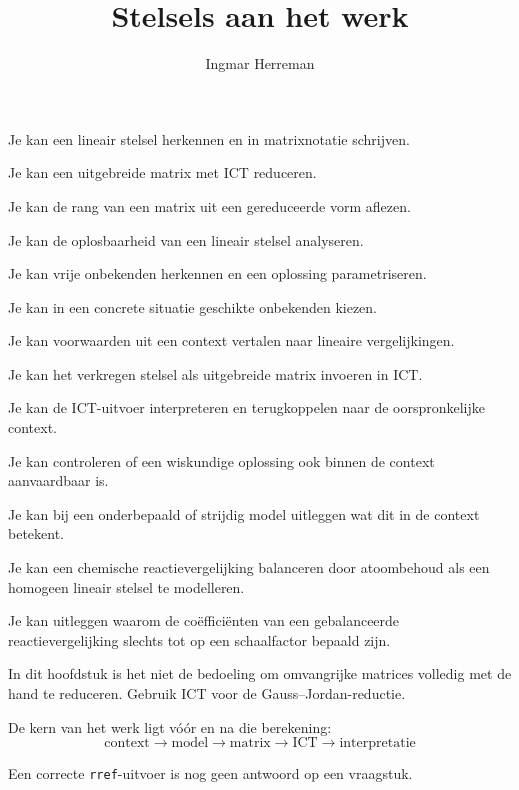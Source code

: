 \documentclass{ximera}
\title{Stelsels aan het werk}
\author{Ingmar Herreman}
\begin{document}





\maketitle

\begin{voorkennis}
  \item Je kan een lineair stelsel herkennen en in matrixnotatie schrijven.
  \item Je kan een uitgebreide matrix met ICT reduceren.
  \item Je kan de rang van een matrix uit een gereduceerde vorm aflezen.
  \item Je kan de oplosbaarheid van een lineair stelsel analyseren.
  \item Je kan vrije onbekenden herkennen en een oplossing parametriseren.
\end{voorkennis}

\begin{leerdoelen}
  \item Je kan in een concrete situatie geschikte onbekenden kiezen.
  \item Je kan voorwaarden uit een context vertalen naar lineaire vergelijkingen.
  \item Je kan het verkregen stelsel als uitgebreide matrix invoeren in ICT.
  \item Je kan de ICT-uitvoer interpreteren en terugkoppelen naar de oorspronkelijke context.
  \item Je kan controleren of een wiskundige oplossing ook binnen de context aanvaardbaar is.
  \item Je kan bij een onderbepaald of strijdig model uitleggen wat dit in de context betekent.
  \item Je kan een chemische reactievergelijking balanceren door atoombehoud als een homogeen lineair stelsel te modelleren.
  \item Je kan uitleggen waarom de coëfficiënten van een gebalanceerde reactievergelijking slechts tot op een schaalfactor bepaald zijn.
\end{leerdoelen}

\begin{opmerking}
In dit hoofdstuk is het niet de bedoeling om omvangrijke matrices volledig
met de hand te reduceren. Gebruik ICT voor de Gauss--Jordan-reductie.

De kern van het werk ligt vóór en na die berekening:
\[
\boxed{\text{context}
\longrightarrow
\text{model}
\longrightarrow
\text{matrix}
\longrightarrow
\text{ICT}
\longrightarrow
\text{interpretatie}}
\]

Een correcte \texttt{rref}-uitvoer is nog geen antwoord op een vraagstuk.
\end{opmerking}
\end{document}
